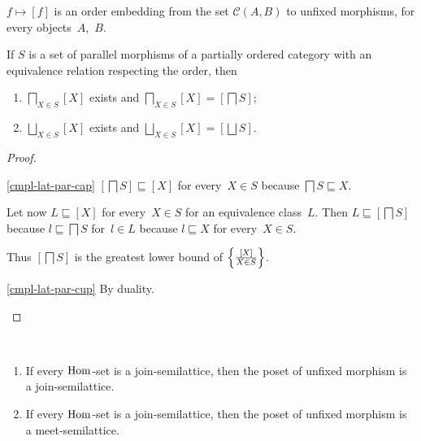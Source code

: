 \begin{obvious}\label{unfix-mor-emb}
$f\mapsto[f]$ is an order embedding from the set
$\mathcal{C}(A,B)$ to unfixed morphisms, for every
objects~$A$,~$B$.
\end{obvious}

\begin{prop}\label{cmpl-lat-par}
If $S$ is a set of parallel morphisms of a partially ordered
category with an equivalence relation respecting the order, then
\begin{enumerate}
\item\label{cmpl-lat-par-cap}
$\bigsqcap_{X\in S}[X]$ exists and 
$\bigsqcap_{X\in S}[X]=[\bigsqcap S]$;

\item\label{cmpl-lat-par-cup}
$\bigsqcup_{X\in S}[X]$ exists and 
$\bigsqcup_{X\in S}[X]=[\bigsqcup S]$.
\end{enumerate}
\end{prop}

\begin{proof}
~
\begin{widedisorder}
\item[\ref{cmpl-lat-par-cap}]
$[\bigsqcap S]\sqsubseteq[X]$ for every~$X\in S$ because
$\bigsqcap S\sqsubseteq X$.

Let now $L\sqsubseteq[X]$ for every~$X\in S$ for an
equivalence class~$L$. Then $L\sqsubseteq[\bigsqcap S]$
because $l\sqsubseteq\bigsqcap S$ for~$l\in L$ because
$l\sqsubseteq X$ for every~$X\in S$.

Thus $[\bigsqcap S]$ is the greatest lower bound of
$\left\{ \frac{[X]}{X\in S}\right\}$.

\item[\ref{cmpl-lat-par-cup}] By duality.
\end{widedisorder}
\end{proof}

\begin{prop}
~
\begin{enumerate}
\item If every $\operatorname{Hom}$-set is a join-semilattice, then
the poset of unfixed morphism is a join-semilattice.
\item If every $\operatorname{Hom}$-set is a join-semilattice, then
the poset of unfixed morphism is a meet-semilattice.
\end{enumerate}
\end{prop}

